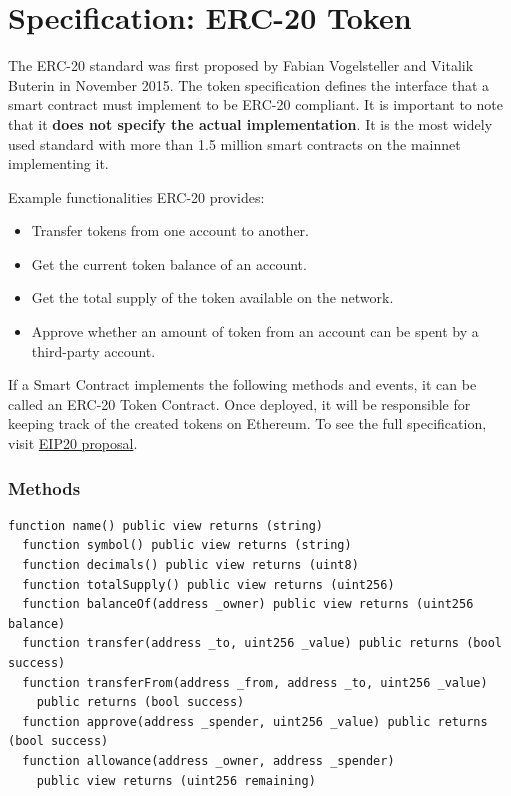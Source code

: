 \documentclass[12pt]{article}
\begin{document}
\section{Specification: ERC-20 Token}

The ERC-20 standard was first proposed by Fabian Vogelsteller and Vitalik Buterin in November 2015. The token specification defines the interface that a smart contract must implement to be ERC-20 compliant. It is important to note that it \textbf{does not specify the actual implementation}. It is the most widely used standard with more than 1.5 million smart contracts on the mainnet implementing it.

\medskip
\noindent
Example functionalities ERC-20 provides:

\begin{itemize}
  \item Transfer tokens from one account to another.
  \item Get the current token balance of an account.
  \item Get the total supply of the token available on the network.
  \item Approve whether an amount of token from an account can be spent by a third-party account.
\end{itemize}

If a Smart Contract implements the following methods and events, it can be called an ERC-20 Token Contract. Once deployed, it will be responsible for keeping track of the created tokens on Ethereum. To see the full specification, visit \href{https://eips.ethereum.org/EIPS/eip-20}{EIP20 proposal}.

\subsubsection*{Methods}

\noindent
\begin{minipage}{\textwidth}
\begin{lstlisting}[language=Solidity]
  function name() public view returns (string)
  function symbol() public view returns (string)
  function decimals() public view returns (uint8)
  function totalSupply() public view returns (uint256)
  function balanceOf(address _owner) public view returns (uint256 balance)
  function transfer(address _to, uint256 _value) public returns (bool success)
  function transferFrom(address _from, address _to, uint256 _value) 
    public returns (bool success)
  function approve(address _spender, uint256 _value) public returns (bool success)
  function allowance(address _owner, address _spender) 
    public view returns (uint256 remaining)  
\end{lstlisting}
\end{minipage}
\end{document}
